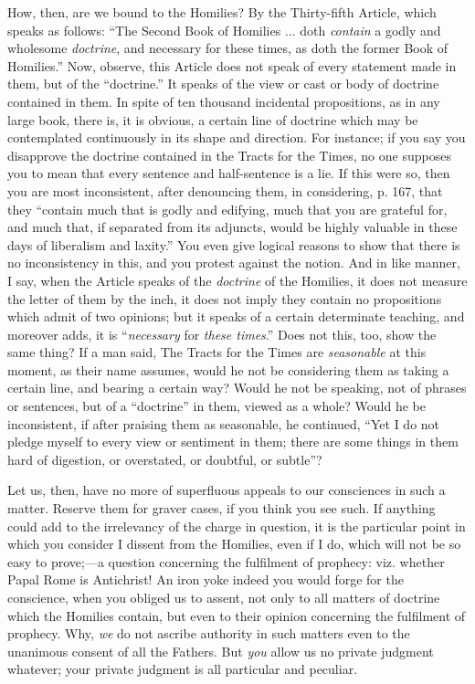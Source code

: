 How, then, are we bound to the Homilies? By the
Thirty-fifth Article, which speaks as follows: ``The Second Book of
Homilies ... doth \emph{contain} a godly and wholesome \emph{doctrine},
and necessary for these times, as doth the former Book of Homilies.''
Now, observe, this Article does not speak of every statement made in
them, but of the ``doctrine.'' It speaks of the view or cast or body of
doctrine contained in them. In spite of ten thousand incidental
propositions, as in any large book, there is, it is obvious, a certain
line of doctrine which may be contemplated continuously in its shape
and direction. For instance; if you say you disapprove the doctrine
contained in the Tracts for the Times, no one supposes you to mean
that every sentence and half-sentence is a lie. If this were so, then
you are most inconsistent, after denouncing them, in considering, p.
167, that they ``contain much that is godly and edifying, much that you
are grateful for, and much that, if separated from its adjuncts, would
be highly valuable in these days of liberalism and laxity.'' You even
give logical reasons to show that there is no inconsistency in this,
and you protest against the notion. And in like manner, I say, when
the Article speaks of the \emph{doctrine} of the Homilies, it does not
measure the letter of them by the inch, it does not imply they contain
no propositions which admit of two opinions; but it speaks of a
certain determinate teaching, and moreover adds, it is ``\emph{necessary}
for \emph{these times}.'' Does not this, too, show the same thing? If a
man said, The Tracts for the Times are \emph{seasonable} at this moment, as
their name assumes, would he not be considering them as taking a
certain line, and bearing a certain way? Would he not be speaking, not
of phrases or sentences, but of a ``doctrine'' in them, viewed as a
whole? Would he be inconsistent, if after praising them as seasonable,
he continued, ``Yet I do not pledge myself to every view or sentiment
in them; there are some things in them hard of digestion, or
overstated, or doubtful, or subtle''?

Let us, then, have no more of superfluous appeals
to our consciences in such a matter. Reserve them for graver cases, if
you think you see such. If anything could add to the irrelevancy of
the charge in question, it is the particular point in which you
consider I dissent from the Homilies, even if I do, which will not be
so easy to prove;—a question concerning the fulfilment of prophecy:
viz. whether Papal Rome is Antichrist! An iron yoke indeed you would
forge for the conscience, when you obliged us to assent, not only to
all matters of doctrine which the Homilies contain, but even to their
opinion concerning the fulfilment of prophecy. Why, \emph{we} do not ascribe
authority in such matters even to the unanimous consent of all the
Fathers. But \emph{you} allow us no private judgment whatever; your
private judgment is all particular and peculiar.

